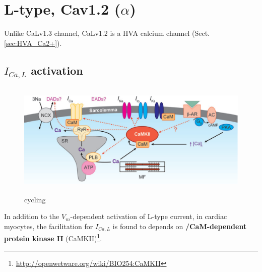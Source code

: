 % 
% 
% 


\section{L-type, Cav1.2 ($\alpha$)}
\label{sec:CaLv1.2-channel}

Unlike CaLv1.3 channel, CaLv1.2 is a HVA calcium channel
(Sect.\ref{sec:HVA_Ca2+}).



\subsection{$I_{Ca,L}$ activation}
\label{sec:i_ca-l-activation}


\begin{figure}[htb]
  \centerline{\includegraphics[height=5.5cm]{./images/Ca_cycling.eps}}
  \caption{ cycling}\label{fig:Ca_cycling}
\end{figure}

In addition to the $V_m$-dependent activation of L-type current, in
cardiac myocytes, the facilitation for $I_{Ca,L}$ is found to depends
on {\bf {}/CaM-dependent protein kinase II}
(CaMKII)\footnote{\url{http://openwetware.org/wiki/BIO254:CaMKII}}. 

